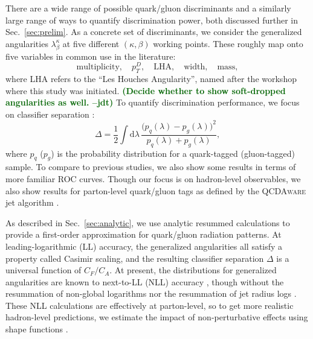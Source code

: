 \documentclass[11pt,letterpaper]{article}
\newcommand{\df}{\text{d}}
\DeclareRobustCommand{\Sec}[1]{Sec.~\ref{#1}}
\newcommand{\be}{\begin{equation}}
\newcommand{\ee}{\end{equation}}
\newcommand{\jdt}[1]{\textbf{\textcolor{darkgreen}{(#1 --jdt)}}}
\begin{document}
There are a wide range of possible quark/gluon discriminants and a similarly large range of ways to quantify discrimination power, both discussed further in  \Sec{sec:prelim}.  As a concrete set of discriminants, we consider the generalized angularities $\lambda_\beta^\kappa$ \cite{} at five different $(\kappa, \beta)$ working points.  These roughly map onto five variables in common use in the literature:
\be
\text{multiplicity}, \quad p_T^D, \quad \text{LHA}, \quad \text{width}, \quad \text{mass},
\ee
where LHA refers to the ``Les Houches Angularity'', named after the workshop where this study was initiated.  \jdt{Decide whether to show soft-dropped angularities as well.}  To quantify discrimination performance, we focus on classifier separation \cite{}:
\be
\Delta =  \frac{1}{2} \int \df \lambda \, \frac{\bigl(p_q(\lambda) - p_g(\lambda)\bigr)^2}{p_q(\lambda) + p_g(\lambda)},
\ee
where $p_q$ ($p_g$) is the probability distribution for a quark-tagged (gluon-tagged) sample.   To compare to previous studies, we also show some results in terms of more familiar ROC curves.  Though our focus is on hadron-level observables, we also show results for parton-level quark/gluon tags as defined by the \textsc{QCDAware} jet algorithm \cite{}.

As described in \Sec{sec:analytic}, we use analytic resummed calculations to provide a first-order approximation for quark/gluon radiation patterns.   At leading-logarithmic (LL) accuracy, the generalized angularities all satisfy a property called Casimir scaling, and the resulting classifier separation $\Delta$ is a universal function of $C_F/C_A$.  At present, the distributions for generalized angularities are known to next-to-LL (NLL) accuracy \cite{}, though without the resummation of non-global logarithms \cite{} nor the resummation of jet radius logs \cite{}.  These NLL calculations are effectively at parton-level, so to get more realistic hadron-level predictions, we estimate the impact of non-perturbative effects using shape functions \cite{}.
\end{document}
